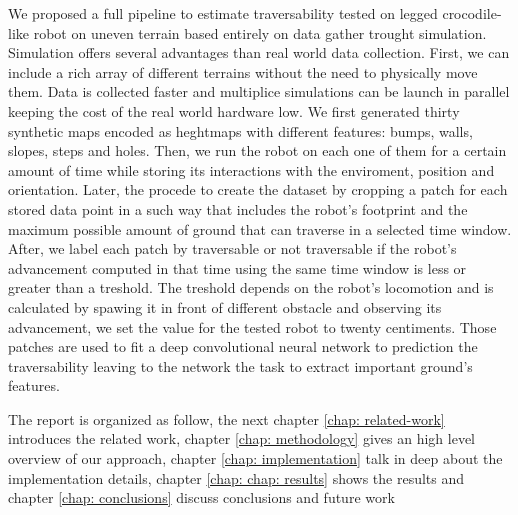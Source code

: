 \documentclass[../document.tex]{subfiles}
\begin{document}
We proposed a full pipeline to estimate traversability tested on legged crocodile-like robot on uneven terrain based entirely on data gather trought simulation. Simulation offers several advantages than real world data collection. First, we can include a rich array of different terrains without the need to physically move them. Data is collected faster and multiplice simulations can be launch in parallel keeping the cost of the real world hardware low. We first generated thirty synthetic maps encoded as heghtmaps with different features: bumps, walls, slopes, steps and holes. Then, we run the robot on each one of them for a certain amount of time while storing its interactions with the enviroment, position and orientation. Later, the procede to create the dataset by cropping a patch for each stored data point in a such way that includes the robot's footprint and the maximum possible amount of ground that can traverse in a selected time window. After, we label each patch by traversable or not traversable if the robot's advancement computed in that time using the same time window is less or greater than a treshold. The treshold depends on the robot's locomotion and is calculated by spawing it in front of different obstacle and observing its advancement, we set the value for the tested robot to twenty centiments. Those patches are used to fit a deep convolutional neural network to prediction the traversability leaving to the network the task to extract important ground's features.

The report is organized as follow, the next chapter \ref{chap: related-work} introduces the related work, chapter \ref{chap: methodology} gives an high level overview of our approach, chapter \ref{chap: implementation} talk in deep about the implementation details, chapter \ref{chap: chap: results} shows the results and chapter \ref{chap: conclusions} discuss conclusions and future work
\end{document}
